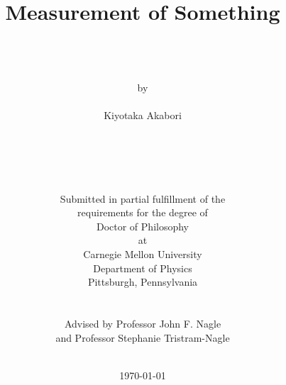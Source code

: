 \documentclass[12pt,twoside]{report}
\author{\\
	\\
	\\
	by \\
	\\
      	Kiyotaka Akabori \\
	\\
	\\
	\\
	\\
	\\
        Submitted in partial fulfillment of the \\
        requirements for the degree of \\
        Doctor of Philosophy \\
        at \\
        Carnegie Mellon University \\
        Department of Physics \\
        Pittsburgh, Pennsylvania \\
	\\
        \\
	Advised by Professor John F. Nagle \\
	and 
	Professor Stephanie Tristram-Nagle
	\\
	\\
}
\title{\bf{
Measurement of Something 
}}
\date{\today}
\begin{document}
 

\thispagestyle{empty}

\maketitle


\thispagestyle{empty} \cleardoublepage

%

%


\thispagestyle{empty} \cleardoublepage


%

%


\tableofcontents 

\listoftables

\listoffigures

\clearpage 




%


\begin{appendices}
  
\end{appendices}



\end{document}

